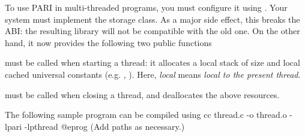 %
%

To use PARI in multi-threaded programs, you must configure it using
. Your system must implement the 
storage class. As a major side effect, this breaks the  ABI: the
resulting library will not be compatible with the old one. On the other hand,
it now provides the following two public functions

 must be called when starting a
thread: it allocates a local stack of size  and local cached
universal constants (e.g. , ). Here, \emph{local} means
\emph{local to the present thread}.

 must be called when closing a thread,
and deallocates the above resources.

\noindent The following sample program can be compiled using
\bprog
    cc thread.c -o thread.o -lpari -lpthread
@eprog\noindent
(Add  paths as necessary.)

\noindent{}

\vfill\eject
